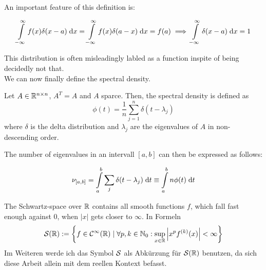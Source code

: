 An important feature of this definition is:

$$\int\limits_{-\infty}^{\infty} f(x) \delta(x-a) \;\mathrm{d}x = \int\limits_{-\infty}^{\infty} f(x) \delta(a-x) \;\mathrm{d}x = f(a) \implies \int\limits_{-\infty}^{\infty} \delta(x-a) \;\mathrm{d}x = 1$$

This distribution is often misleadingly labled as a function inspite of being decidedly not that.\\
We can now finally define the spectral density.

\begin{definition} 
    Let $A \in \mathbb{R}^{n \times n}$, $A^T = A$ and $A$ sparce.
    Then, the spectral density is defined as
    $$\phi(t) = \frac{1}{n} \sum_{j=1}^{n} \delta(t - \lambda_j)$$
    where $\delta$ is the delta distribution and $\lambda_j$ are the eigenvalues of $A$ in non-descending order.
\end{definition}

The number of eigenvalues in an intervall $[a, b]$ can then be expressed as follows:

\begin{equation} \label{eq:nu_a_b}
    \nu_{[a, b]} = \int\limits_a^b \sum_j \delta(t - \lambda_j) \;\mathrm{d}t \equiv \int\limits_a^b n \phi(t) \;\mathrm{d}t
\end{equation}

\begin{definition}  \label{def:Schwartz space}
    The Schwartz-space over $\mathbb{R}$ contains all smooth functions $f$,
    which fall fast enough against $0$, when $|x|$ gets closer to $\infty$. \cite{richtmyer}
    In Formeln
    $$\mathcal{S}(\mathbb{R}) := \left\{f \in \mathcal{C}^{\infty}(\mathbb{R}) \mid \forall p, k \in \mathbb{N}_0: \sup_{x \in \mathbb{R}} \left| x^pf^{(k)}(x)\right| < \infty \right\}$$
    Im Weiteren werde ich das Symbol $\mathcal{S}$ als Abkürzung für $\mathcal{S}(\mathbb{R})$ benutzen,
    da sich diese Arbeit allein mit dem reellen Kontext befasst.
\end{definition}
